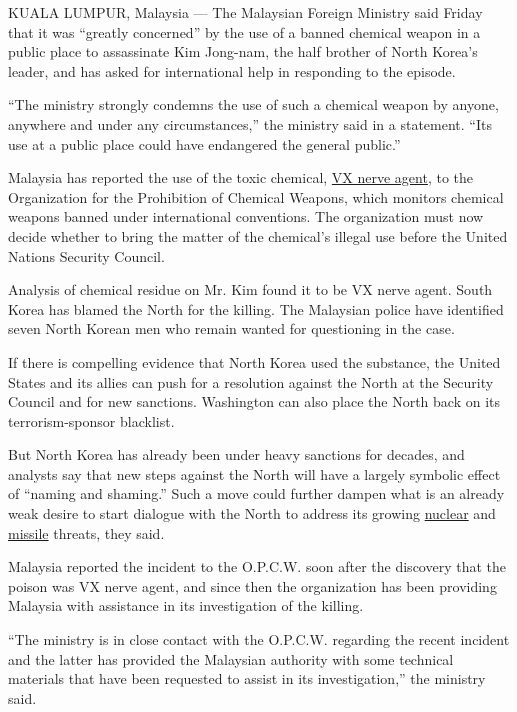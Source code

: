 KUALA LUMPUR, Malaysia --- The Malaysian Foreign Ministry said Friday
that it was ``greatly concerned'' by the use of a banned chemical weapon
in a public place to assassinate Kim Jong-nam, the half brother of North
Korea's leader, and has asked for international help in responding to
the episode.

``The ministry strongly condemns the use of such a chemical weapon by
anyone, anywhere and under any circumstances,'' the ministry said in a
statement. ``Its use at a public place could have endangered the general
public.''

Malaysia has reported the use of the toxic chemical,
\href{https://www.nytimes.com/2017/02/24/world/asia/vx-nerve-agent-kim-jong-nam.html?_r=0}{VX
nerve agent}, to the Organization for the Prohibition of Chemical
Weapons, which monitors chemical weapons banned under international
conventions. The organization must now decide whether to bring the
matter of the chemical's illegal use before the United Nations Security
Council.

Analysis of chemical residue on Mr. Kim found it to be VX nerve agent.
South Korea has blamed the North for the killing. The Malaysian police
have identified seven North Korean men who remain wanted for questioning
in the case.

If there is compelling evidence that North Korea used the substance, the
United States and its allies can push for a resolution against the North
at the Security Council and for new sanctions. Washington can also place
the North back on its terrorism-sponsor blacklist.

But North Korea has already been under heavy sanctions for decades, and
analysts say that new steps against the North will have a largely
symbolic effect of ``naming and shaming.'' Such a move could further
dampen what is an already weak desire to start dialogue with the North
to address its growing
\href{https://www.nytimes.com/topic/subject/north-koreas-nuclear-program}{nuclear}
and
\href{https://www.nytimes.com/2017/02/11/world/asia/north-korea-missile-test-trump.html}{missile}
threats, they said.

Malaysia reported the incident to the O.P.C.W. soon after the discovery
that the poison was VX nerve agent, and since then the organization has
been providing Malaysia with assistance in its investigation of the
killing.

``The ministry is in close contact with the O.P.C.W. regarding the
recent incident and the latter has provided the Malaysian authority with
some technical materials that have been requested to assist in its
investigation,'' the ministry said.

